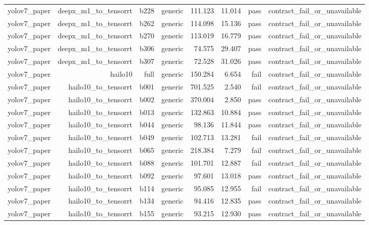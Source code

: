 \begin{table}[t]
\begin{tabular}{lrrrrrrr}
yolov7\_paper & deepx\_m1\_to\_tensorrt & b228 & generic & 111.123 & 11.014 & pass & contract\_fail\_or\_unavailable \\
yolov7\_paper & deepx\_m1\_to\_tensorrt & b262 & generic & 114.098 & 15.136 & pass & contract\_fail\_or\_unavailable \\
yolov7\_paper & deepx\_m1\_to\_tensorrt & b270 & generic & 113.019 & 16.779 & pass & contract\_fail\_or\_unavailable \\
yolov7\_paper & deepx\_m1\_to\_tensorrt & b306 & generic & 74.575 & 29.407 & pass & contract\_fail\_or\_unavailable \\
yolov7\_paper & deepx\_m1\_to\_tensorrt & b307 & generic & 72.528 & 31.026 & pass & contract\_fail\_or\_unavailable \\
yolov7\_paper & hailo10 & full & generic & 150.284 & 6.654 & fail & contract\_fail\_or\_unavailable \\
yolov7\_paper & hailo10\_to\_tensorrt & b001 & generic & 701.525 & 2.540 & fail & contract\_fail\_or\_unavailable \\
yolov7\_paper & hailo10\_to\_tensorrt & b002 & generic & 370.004 & 2.850 & pass & contract\_fail\_or\_unavailable \\
yolov7\_paper & hailo10\_to\_tensorrt & b013 & generic & 132.863 & 10.884 & pass & contract\_fail\_or\_unavailable \\
yolov7\_paper & hailo10\_to\_tensorrt & b044 & generic & 98.136 & 11.844 & pass & contract\_fail\_or\_unavailable \\
yolov7\_paper & hailo10\_to\_tensorrt & b049 & generic & 102.713 & 13.281 & fail & contract\_fail\_or\_unavailable \\
yolov7\_paper & hailo10\_to\_tensorrt & b065 & generic & 218.384 & 7.279 & fail & contract\_fail\_or\_unavailable \\
yolov7\_paper & hailo10\_to\_tensorrt & b088 & generic & 101.701 & 12.887 & fail & contract\_fail\_or\_unavailable \\
yolov7\_paper & hailo10\_to\_tensorrt & b092 & generic & 97.601 & 13.018 & pass & contract\_fail\_or\_unavailable \\
yolov7\_paper & hailo10\_to\_tensorrt & b114 & generic & 95.085 & 12.955 & fail & contract\_fail\_or\_unavailable \\
yolov7\_paper & hailo10\_to\_tensorrt & b134 & generic & 94.416 & 12.835 & pass & contract\_fail\_or\_unavailable \\
yolov7\_paper & hailo10\_to\_tensorrt & b155 & generic & 93.215 & 12.930 & pass & contract\_fail\_or\_unavailable \\

\end{tabular}
\end{table}
